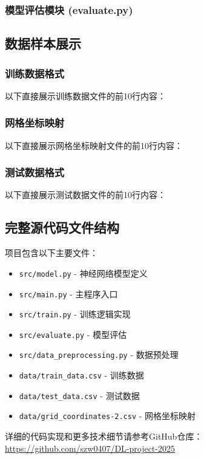 \documentclass{article}
\begin{document}
\subsubsection{模型评估模块 (evaluate.py)}


\subsection{数据样本展示}
\subsubsection{训练数据格式}
以下直接展示训练数据文件的前10行内容：

\subsubsection{网格坐标映射}
以下直接展示网格坐标映射文件的前10行内容：

\subsubsection{测试数据格式}
以下直接展示测试数据文件的前10行内容：

\subsection{完整源代码文件结构}

项目包含以下主要文件：

\begin{itemize}
    \item \texttt{src/model.py} - 神经网络模型定义
    \item \texttt{src/main.py} - 主程序入口
    \item \texttt{src/train.py} - 训练逻辑实现
    \item \texttt{src/evaluate.py} - 模型评估
    \item \texttt{src/data\_preprocessing.py} - 数据预处理
    \item \texttt{data/train\_data.csv} - 训练数据
    \item \texttt{data/test\_data.csv} - 测试数据
    \item \texttt{data/grid\_coordinates-2.csv} - 网格坐标映射
\end{itemize}

详细的代码实现和更多技术细节请参考GitHub仓库：\url{https://github.com/szw0407/DL-project-2025}
\end{document}
